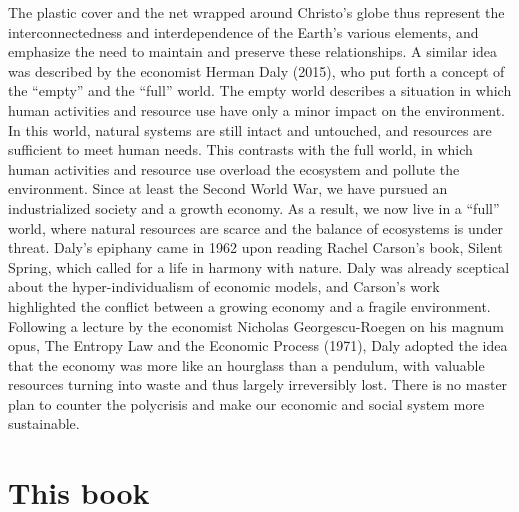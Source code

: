 \documentclass[
  letterpaper,
  DIV=11,
  numbers=noendperiod]{scrreprt}
\begin{document}
The plastic cover and the net wrapped around Christo's globe thus
represent the interconnectedness and interdependence of the Earth's
various elements, and emphasize the need to maintain and preserve these
relationships. A similar idea was described by the economist Herman Daly
(2015), who put forth a concept of the ``empty'' and the ``full'' world.
The empty world describes a situation in which human activities and
resource use have only a minor impact on the environment. In this world,
natural systems are still intact and untouched, and resources are
sufficient to meet human needs. This contrasts with the full world, in
which human activities and resource use overload the ecosystem and
pollute the environment. Since at least the Second World War, we have
pursued an industrialized society and a growth economy. As a result, we
now live in a ``full'' world, where natural resources are scarce and the
balance of ecosystems is under threat. Daly's epiphany came in 1962 upon
reading Rachel Carson's book, Silent Spring, which called for a life in
harmony with nature. Daly was already sceptical about the
hyper-individualism of economic models, and Carson's work highlighted
the conflict between a growing economy and a fragile environment.
Following a lecture by the economist Nicholas Georgescu-Roegen on his
magnum opus, The Entropy Law and the Economic Process (1971), Daly
adopted the idea that the economy was more like an hourglass than a
pendulum, with valuable resources turning into waste and thus largely
irreversibly lost. There is no master plan to counter the polycrisis and
make our economic and social system more sustainable.

\section{This book}\label{this-book}
\end{document}
